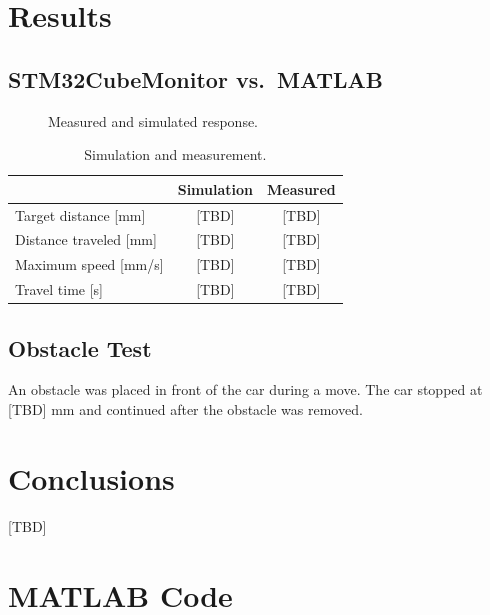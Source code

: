 \documentclass[11pt,a4paper]{article}
\let\TEColdsection\section
\renewcommand{\section}{\clearpage\TEColdsection}
\begin{document}
\section{Results}

\subsection{STM32CubeMonitor vs.\ MATLAB}
\begin{figure}[H]
  \centering
  \caption{Measured and simulated response.}
\end{figure}

\begin{table}[H]
  \centering
  \caption{Simulation and measurement.}
  \begin{tabular}{@{}lcc@{}}
    \toprule
    & \textbf{Simulation} & \textbf{Measured} \\ \midrule
    Target distance [mm]   & [TBD] & [TBD] \\
    Distance traveled [mm] & [TBD] & [TBD] \\
    Maximum speed [mm/s]   & [TBD] & [TBD] \\
    Travel time [s]        & [TBD] & [TBD] \\ \bottomrule
  \end{tabular}
\end{table}

\subsection{Obstacle Test}
An obstacle was placed in front of the car during a move.
The car stopped at [TBD] mm and continued after the obstacle was removed.

\section{Conclusions}
[TBD]

\appendix
\section{MATLAB Code}\label{app:code}

\end{document}
